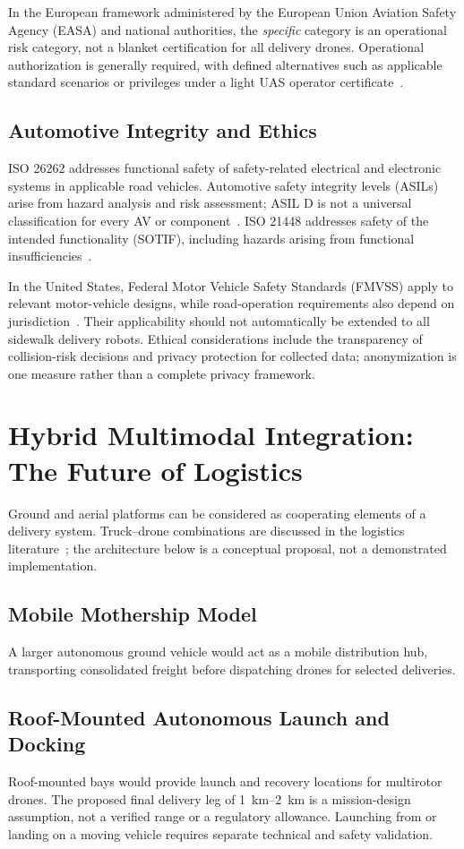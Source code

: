 \documentclass[11pt,a4paper]{article}
\begin{document}
In the European framework administered by the European Union Aviation Safety Agency (EASA) and national authorities, the \emph{specific} category is an operational risk category, not a blanket certification for all delivery drones. Operational authorization is generally required, with defined alternatives such as applicable standard scenarios or privileges under a light UAS operator certificate~\cite{easaSpecific}.

\subsection{Automotive Integrity and Ethics}
ISO 26262 addresses functional safety of safety-related electrical and electronic systems in applicable road vehicles. Automotive safety integrity levels (ASILs) arise from hazard analysis and risk assessment; ASIL D is not a universal classification for every AV or component~\cite{iso26262}. ISO 21448 addresses safety of the intended functionality (SOTIF), including hazards arising from functional insufficiencies~\cite{iso21448}.

In the United States, Federal Motor Vehicle Safety Standards (FMVSS) apply to relevant motor-vehicle designs, while road-operation requirements also depend on jurisdiction~\cite{nhtsa2017}. Their applicability should not automatically be extended to all sidewalk delivery robots. Ethical considerations include the transparency of collision-risk decisions and privacy protection for collected data; anonymization is one measure rather than a complete privacy framework.

\section{Hybrid Multimodal Integration: The Future of Logistics}
Ground and aerial platforms can be considered as cooperating elements of a delivery system. Truck--drone combinations are discussed in the logistics literature~\cite{engesser2023}; the architecture below is a conceptual proposal, not a demonstrated implementation.

\subsection{Mobile Mothership Model}
A larger autonomous ground vehicle would act as a mobile distribution hub, transporting consolidated freight before dispatching drones for selected deliveries.

\subsection{Roof-Mounted Autonomous Launch and Docking}
Roof-mounted bays would provide launch and recovery locations for multirotor drones. The proposed final delivery leg of \SIrange{1}{2}{\kilo\metre} is a mission-design assumption, not a verified range or a regulatory allowance. Launching from or landing on a moving vehicle requires separate technical and safety validation.
\end{document}
